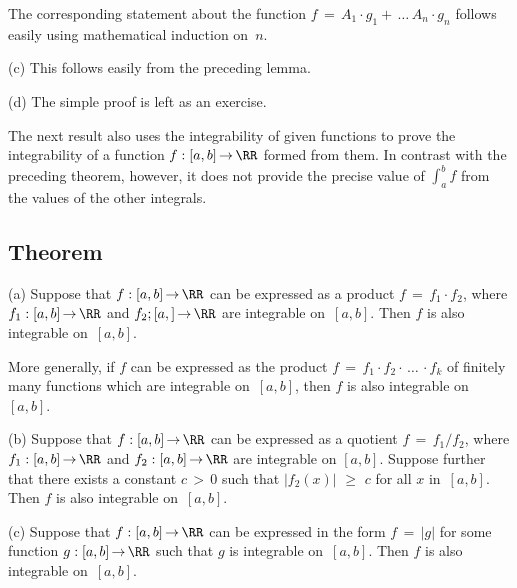         The corresponding statement about the function $f \,=\, A_{1}{\cdot}g_{1} + \,{\ldots}\,A_{n}{\cdot}g_{n}$ follows easily using mathematical induction on~$n$.

\V

        (c) This follows easily from the preceding lemma. %

\V

        (d) The simple proof is left as an exercise. %

\VV

        The next result also uses the integrability of given functions to prove the integrability of a function $f:[a,b] \,{\rightarrow}\, {\RR}$ formed from them.
    In contrast with the preceding theorem, however, it does not provide the precise value of ${\displaystyle \int_{a}^{b} f}$ from the values of the other integrals.

\VV%

        \subsection{\small{{\bf Theorem}}}
        \label{ThmH25.30}

\V

\hspace*{\parindent}(a) Suppose that $f:[a,b] \,{\rightarrow}\, {\RR}$ can  be expressed as a product $f \,=\, f_{1}{\cdot}f_{2}$,
    where $f_{1}:[a,b] \,{\rightarrow}\, {\RR}$ and $f_{2};[a,] \,{\rightarrow}\, {\RR}$ are integrable on~$[a,b]$. Then $f$ is also integrable on~$[a,b]$.

        More generally, if $f$ can  be expressed as the product $f \,=\, f_{1}{\cdot}f_{2}{\cdot}\,{\ldots}\,{\cdot}f_{k}$
    of finitely many functions which are integrable on~$[a,b]$, then $f$ is also integrable on~$[a,b]$.

\V

        (b) Suppose that $f:[a,b] \,{\rightarrow}\, {\RR}$ can be expressed as a quotient $f \,=\, f_{1}/f_{2}$,
    where $f_{1}:[a,b] \,{\rightarrow}\, {\RR}$ and $f_{2}:[a,b] \,{\rightarrow}\, {\RR}$ are integrable on $[a,b]$.
    Suppose further that there exists a constant $c\,>\,0$ such that $|f_{2}(x)|\,\,{\geq}\,\,c$ for all $x$ in~$[a,b]$. Then $f$ is also integrable on~$[a,b]$.

\V

        (c) Suppose that $f:[a,b] \,{\rightarrow}\, {\RR}$ can be expressed in the form $f \,=\, |g|$ for some function $g:[a,b] \,{\rightarrow}\, {\RR}$ such that $g$ is integrable on~$[a,b]$.
    Then $f$ is also integrable on~$[a,b]$.

